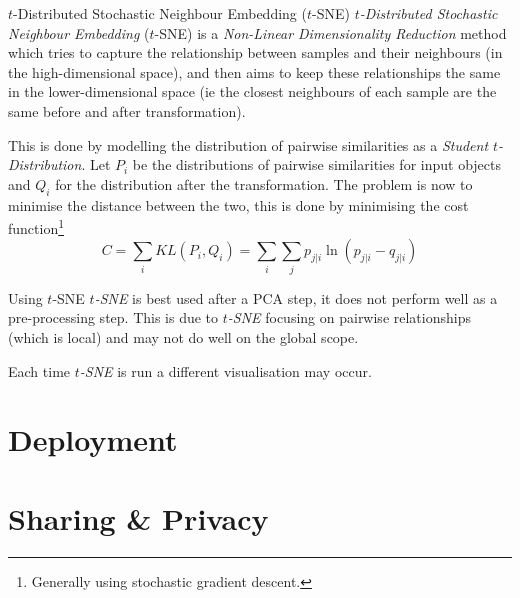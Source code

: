 \documentclass[11pt,a4paper]{article}
\begin{document}
  \begin{definition}{$t$-Distributed Stochastic Neighbour Embedding ($t$-SNE)}
    \textit{$t$-Distributed Stochastic Neighbour Embedding} ($t$-SNE) is a \textit{Non-Linear Dimensionality Reduction} method which tries to capture the relationship between samples and their neighbours (in the high-dimensional space), and then aims to keep these relationships the same in the lower-dimensional space (ie the closest neighbours of each sample are the same before and after transformation).
    \par This is done by modelling the distribution of pairwise similarities as a \textit{Student $t$-Distribution}. Let $P_i$ be the distributions of pairwise similarities for input objects and $Q_i$ for the distribution after the transformation. The problem is now to minimise the distance between the two, this is done by minimising the cost function\footnote{Generally using stochastic gradient descent.}
    \[ C=\sum_iKL(P_i,Q_i)=\sum_i\sum_jp_{j|i}\ln(p_{j|i}-q_{j|i}) \]
  \end{definition}

  \begin{remark}{Using $t$-SNE}
    \textit{$t$-SNE} is best used after a PCA step, it does not perform well as a pre-processing step. This is due to \textit{$t$-SNE} focusing on pairwise relationships (which is local) and may not do well on the global scope.
    \par Each time \textit{$t$-SNE} is run a different visualisation may occur.
  \end{remark}

\section{Deployment}\label{sec_deployment}

\section{Sharing \& Privacy}\label{sec_sharing_and_privacy}
\end{document}
